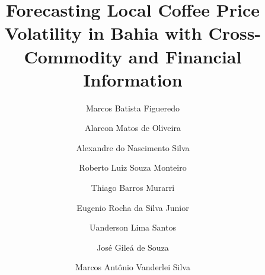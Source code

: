 \documentclass[a4paper,fleqn]{cas-sc}
\begin{document}
\let\WriteBookmarks\relax
\def\floatpagepagefraction{1}
\def\textpagefraction{.001}



\title [mode = title]{Forecasting Local Coffee Price Volatility in Bahia with Cross-Commodity and Financial Information}  

\author[1]{Marcos Batista Figueredo}
\cormark[1]
\author[1]{Alarcon Matos de Oliveira}
\author[1]{Alexandre do Nascimento Silva}
\author[1]{Roberto Luiz Souza Monteiro}
\author[2]{Thiago Barros Murarri}
\author[1]{Eugenio Rocha da Silva Junior}
\author[1]{Uanderson Lima Santos}
\author[1]{José Gileá de Souza}
\author[1]{Marcos Antônio Vanderlei Silva}




\end{document}
